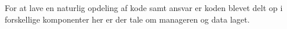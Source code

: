 For at lave en naturlig opdeling af kode samt ansvar er koden blevet delt op i forskellige komponenter her er der tale om manageren og data laget.